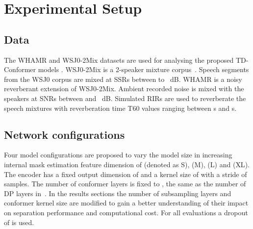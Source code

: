 \section{Experimental Setup}\label{sec:expsetup}
\subsection{Data}
The WHAMR and WSJ0-2Mix datasets are used for analysing the proposed TD-Conformer models \cite{Isik,WHAMR}. WSJ0-2Mix is a 2-speaker mixture corpus~\cite{Isik}. Speech segments from the WSJ0 corpus are mixed at \acp{SSR} between  to ~dB.
WHAMR is a noisy reverberant extension of WSJ0-2Mix. Ambient recorded noise is mixed with the speakers at \acp{SNR} between  and ~dB. Simulated \acp{RIR} are used to reverberate the speech mixtures with reverberation time T60 values ranging between s and s.

\subsection{Network configurations}\label{sec:netconfig}
Four model configurations are proposed to vary the model size in increasing internal mask estimation feature dimension  of  (denoted as \ac{S}),  (\ac{M}),  (\ac{L}) and  (\ac{XL}). The encoder has a fixed output dimension of  and a kernel size of  with a  stride of  samples. The number of conformer layers is fixed to , the same as the number of \ac{DP} layers in~\cite{sepformer}. In the results sections the number of subsampling layers  and conformer kernel size  are modified to gain a better understanding of their impact on separation performance and computational cost. For all evaluations a dropout of  is used.

